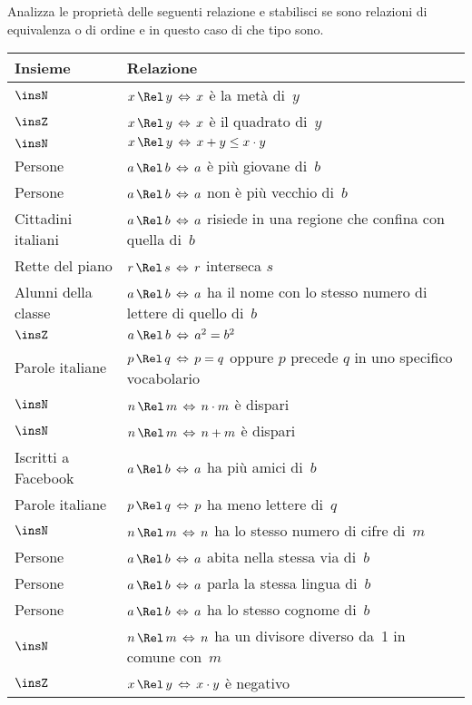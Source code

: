 \begin{esercizio}
\label{ese:7.58}
Analizza le proprietà delle seguenti relazione e stabilisci se sono relazioni di equivalenza o di ordine e in questo caso di che tipo sono.
\begin{center}
\begin{tabular}{ll}
\toprule
Insieme & Relazione\\
\midrule
$\insN$ & $x \, \Rel \, y\, \Leftrightarrow\, x $ è la metà di~$ y $\\
$\insZ$ & $x \, \Rel \, y\, \Leftrightarrow\, x $ è il quadrato di~$ y $\\
$\insN$ & $x \, \Rel \, y\, \Leftrightarrow\, x+y\le x\cdot y $\\
Persone &$a \, \Rel \, b\, \Leftrightarrow\, a $ è più giovane di~$ b $ \\
Persone &$a \, \Rel \, b\, \Leftrightarrow\, a $ non è più vecchio di~$ b $ \\
Cittadini italiani &$a \, \Rel \, b\, \Leftrightarrow\, a $ risiede in una regione che confina con quella di~$ b $ \\
Rette del piano &$r \, \Rel \, s\, \Leftrightarrow\, r $ interseca $s$\\ 
Alunni della classe &$a \, \Rel \, b\, \Leftrightarrow\, a $ ha il nome con lo stesso numero di lettere di quello di~$ b $ \\
$\insZ$ & $a \, \Rel \, b\, \Leftrightarrow\, a^{2}=b^{2} $\\
Parole italiane & $p \, \Rel \, q\, \Leftrightarrow\, p=q $ oppure $ p $ precede $ q $ in uno specifico vocabolario\\
$\insN$ & $n \, \Rel \, m\, \Leftrightarrow\, n \cdot m $ è dispari\\
$\insN$ & $n \, \Rel \, m\, \Leftrightarrow\, n + m $ è dispari\\
Iscritti a Facebook &$a \, \Rel \, b\, \Leftrightarrow\, a $ ha più amici di~$ b $\\
Parole italiane & $p \, \Rel \, q\, \Leftrightarrow\, p $ ha meno lettere di~$ q $\\
$\insN$ & $n \, \Rel \, m\, \Leftrightarrow\, n $ ha lo stesso numero di cifre di~$ m $\\
Persone &$a \, \Rel \, b\, \Leftrightarrow\, a $ abita nella stessa via di~$ b $ \\
Persone &$a \, \Rel \, b\, \Leftrightarrow\, a $ parla la stessa lingua di~$ b $ \\
Persone &$a \, \Rel \, b\, \Leftrightarrow\, a $ ha lo stesso cognome di~$ b $ \\
$\insN$ & $n \, \Rel \, m\, \Leftrightarrow\, n $ ha un divisore diverso da~1 in comune con~$ m $\\
$\insZ$ & $x \, \Rel \, y\, \Leftrightarrow\, x\cdot y $ è negativo\\
\bottomrule
\end{tabular}
\end{center}
\end{esercizio}

